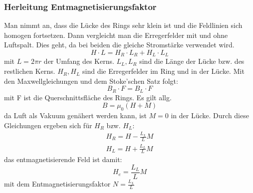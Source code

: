         \subsubsection*{Herleitung Entmagnetisierungsfaktor}
            Man nimmt an, dass die Lücke des Rings sehr klein ist und die Feldlinien sich homogen
            fortsetzen. Dann vergleicht man die Erregerfelder mit und ohne Luftspalt. Dies geht, da 
            bei beiden die gleiche Stromstärke verwendet wird.
            \begin{equation}
                H \cdot L = H_R \cdot L_R + H_L \cdot L_L
            \end{equation}
            mit $L = 2 \pi r$ der Umfang des Kerns. $L_L, L_R$ sind die Länge der Lücke bzw. des restlichen Kerns.
            $H_R, H_L$ sind die Erregerfelder im Ring und in der Lücke.
            Mit den Maxwellgleichungen und dem Stoke'schen Satz folgt:
            \begin{equation}
                B_R \cdot F = B_L \cdot F
            \end{equation}
            mit F ist die Querschnittsfläche des Rings. Es gilt allg.
            \begin{equation}
                B = \mu_0 (H + M)
            \end{equation}
            da Luft als Vakuum genähert werden kann, ist $M=0$ in der Lücke.
            Durch diese Gleichungen ergeben sich für $H_R$ bzw. $H_L$:
            \begin{align*}
                H_R = H - \frac{L_L}{L} M\\
                H_L = H + \frac{L_L}{L} M
            \end{align*}
            das entmagnetisierende Feld ist damit:
            \begin{equation}
                H_e = \frac{L_L}{L} M 
            \end{equation}
            mit dem Entmagnetisierungsfaktor $N = \frac{L_L}{L}$
